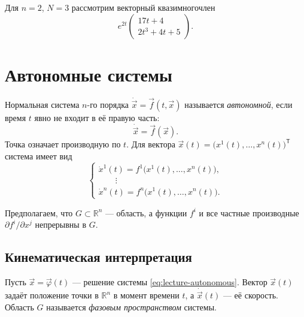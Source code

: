 \documentclass[12pt,a4paper]{article}
\numberwithin{equation}{section}
\newcommand{\R}{\mathbb{R}}
\newcommand{\vect}[1]{\vec{#1}}
\begin{document}
\begin{exampleHSE}
Для $n=2$, $N=3$ рассмотрим векторный квазимногочлен
\[
e^{2t}
\begin{pmatrix}
17t+4\\
2t^3+4t+5
\end{pmatrix}.
\]
\end{exampleHSE}

\section[Автономные системы]{Автономные системы}

\begin{definitionHSE}
Нормальная система $n$-го порядка $\dot{\vect{x}}=\vect f(t,\vect{x})$
называется \textit{автономной}, если время $t$ явно не входит в её правую часть:
\begin{equation}
 \dot{\vect{x}}=\vect f(\vect{x}).
 \label{eq:lecture-autonomous}
\end{equation}
Точка означает производную по $t$. Для вектора
$\vect{x}(t)=\bigl(x^1(t),\ldots,x^n(t)\bigr)^{\mathsf T}$ система имеет вид
\[
 \begin{cases}
 \dot{x}^1(t)=f^1\bigl(x^1(t),\ldots,x^n(t)\bigr),\\
 \hspace{2em}\vdots\\
 \dot{x}^n(t)=f^n\bigl(x^1(t),\ldots,x^n(t)\bigr).
 \end{cases}
\]
\end{definitionHSE}

Предполагаем, что $G\subset\R^n$ --- область, а функции $f^i$ и все
частные производные $\partial f^i/\partial x^j$ непрерывны в $G$.

\subsection{Кинематическая интерпретация}

Пусть $\vect{x}=\vect\varphi(t)$ --- решение системы \eqref{eq:lecture-autonomous}.
Вектор $\vect{x}(t)$ задаёт положение точки в $\R^n$ в момент времени $t$,
а $\dot{\vect{x}}(t)$ --- её скорость. Область $G$ называется
\textit{фазовым пространством} системы.
\end{document}
